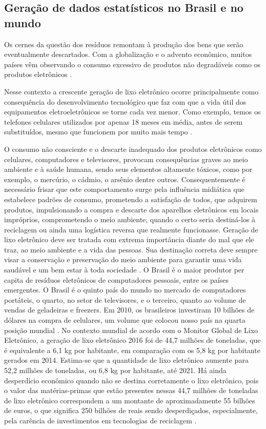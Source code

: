 \documentclass[
	12pt,				%
	openany,			%
	twoside,			%
	a4paper,			%
	english,			%
	french,				%
	spanish,			%
	brazil				%
	]{abntex2}
\begin{document}
\subsection{Geração de dados estatísticos no Brasil e no mundo}
Os cernes da questão dos resíduos remontam à produção dos bens que serão eventualmente descartados. Com a globalização e o advento econômico, muitos países vêm observando o consumo excessivo de produtos não degradáveis como os produtos eletrônicos \cite{esc}.

Nesse contexto a crescente geração de lixo eletrônico ocorre principalmente como consequência do desenvolvimento tecnológico que faz com que a vida útil dos equipamentos eletroeletrônicos se torne cada vez menor. Como exemplo, temos os telefones celulares utilizados por apenas 18 meses em média, antes de serem substituídos, mesmo que funcionem por muito mais tempo \cite{oicd}.

O consumo não consciente e o descarte inadequado dos produtos eletrônicos como celulares, computadores e televisores, provocam consequências graves ao meio ambiente e à saúde humana, sendo seus elementos altamente tóxicos, como por exemplo, o mercúrio, o cádmio, o arsênio dentre outros. Consequentemente é necessário frisar que este comportamento surge pela influência midiática que estabelece padrões de consumo, prometendo a satisfação de todos, que adquirem produtos, impulsionando a compra e descarte dos aparelhos eletrônicos em locais impróprios, comprometendo o meio ambiente, quando o certo seria destiná-los à reciclagem ou ainda uma logística reversa que realmente funcionasse. Geração de lixo eletrônico deve ser tratada com extrema importância diante do mal que ele traz, ao meio ambiente e a vida das pessoas. Sua destinação correta deve sempre visar a conservação e preservação do meio ambiente para garantir uma vida saudável e um bem estar à toda sociedade \cite{vbo_aa_ntn}.
O Brasil é o maior produtor per capita de resíduos eletrônicos de computadores pessoais, entre os países emergentes. O Brasil é o quinto país do mundo no mercado de computadores portáteis, o quarto, no setor de televisores, e o terceiro, quanto ao volume de vendas de geladeiras e freezers. Em 2010, os brasileiros investiram 10 bilhões de dólares na compra de celulares, um volume que colocou nosso país na quarta posição mundial \cite{vbd}.
No contexto mundial de acordo com o Monitor Global de Lixo Eletrônico, a geração de lixo eletrônico 2016 foi de 44,7 milhões de toneladas, que é equivalente a 6,1 kg por habitante, em comparação com os 5,8 kg por habitante gerados em 2014. Estima-se que a quantidade de lixo eletrônico aumente para 52,2 milhões de toneladas, ou 6,8 kg por habitante, até 2021. Há ainda desperdício econômico quando não se destina corretamente o lixo eletrônico,  pois  o  valor  das  matérias-primas  que  estão  presentes  nessas 44,7   milhões   de   toneladas de   lixo   eletrônico   correspondem   a   um   montante   de aproximadamente  55  bilhões  de  euros,  o  que  significa 250  bilhões  de  reais  sendo desperdiçados,   especialmente,   pela   carência   de   investimentos   em   tecnologias   de reciclagem \cite{dcfrjcvs}. 
\end{document}
